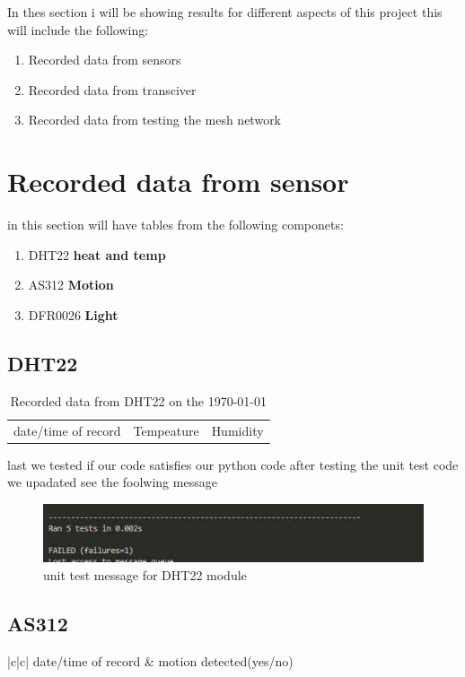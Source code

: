 In thes section i will  be showing results for  different aspects of this project this  will  include the following:
\begin{enumerate}
    \item Recorded data from sensors
    \item Recorded data from transciver
    \item Recorded data from  testing the mesh network
\end{enumerate}
\section{Recorded data from sensor}
in this section  will have  tables from the following componets:
\begin{enumerate}
    \item DHT22 \textbf{heat and temp}
    \item AS312 \textbf{Motion }
    \item DFR0026 \textbf{Light}
\end{enumerate}
\subsection{DHT22}
\begin{table}
    \begin{tabular}{|c|c|c|}
        \hline
        date/time of record & Tempeature &Humidity 
        \hline\hline
    \end{tabular}
    \caption{Recorded data from  DHT22 on the \today}
    \label*{Recorded data from  DHT22 on the \today}
\end{table}
last we tested if our code  satisfies our  python code after testing the unit test code we upadated see the foolwing message
\begin{figure}[h!]
    \centering
    \includegraphics*[width=0.5\linewidth]{Images/unit_testoutput.jpg}
    \caption*{unit test message for DHT22 module}
    \label{unit test message for DHT22 module}
\end{figure}
\subsection*{AS312}
\begin{table}
    \begin{tabular*}{|c|c|}
        date/time of record & motion detected(yes/no)
    \end{tabular*}
    \caption*{Recorded data from  AS312 on the \today}
    \label*{Recorded data from  AS312 on the \today}
\end{table}

